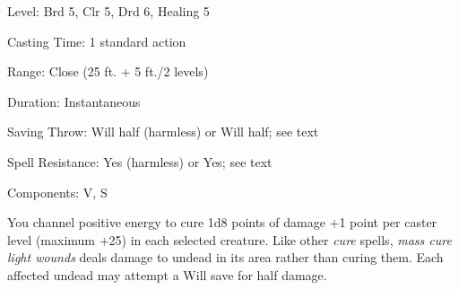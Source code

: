 
\begin{description*}
\item[Level:] Brd 5, Clr 5, Drd 6, Healing 5
\item[Casting Time:] 1 standard action
\item[Range:] Close (25 ft. + 5 ft./2 levels)
\item[Duration:] Instantaneous
\item[Saving Throw:] Will half (harmless) or Will half; see text
\item[Spell Resistance:] Yes (harmless) or Yes; see text
\item[Components:] V, S
\end{description*}

You channel positive energy to cure 1d8 points of damage +1 point per caster level
(maximum +25) in each selected creature.
Like other \textit{cure} spells, \textit{mass cure light wounds} deals damage to
undead in its area rather than curing them. Each affected undead may attempt a
Will save for half damage.